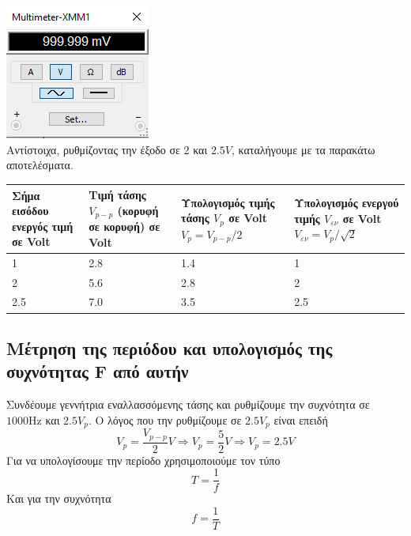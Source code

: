 \documentclass{article}
\begin{document}
\includegraphics[width=\textwidth / 2,center]{./res/ex2vm.png} \\

Αντίστοιχα, ρυθμίζοντας την έξοδο σε 2 και $2.5V$, καταλήγουμε με
τα παρακάτω αποτελέσματα.

\begin{center}
\begin{tabular}{|p{30mm}|p{30mm}|p{30mm}|p{30mm}|}
        \hline
        Σήμα εισόδου ενεργός τιμή σε Volt &
        Τιμή τάσης $V_{p-p}$ (κορυφή σε κορυφή) σε Volt &
        Υπολογισμός τιμής τάσης $V_p$ σε Volt $V_p = V_{p-p} / 2$ &
        Υπολογισμός ενεργού τιμής $V_{εν}$ σε Volt $V_{εν} = V_p / \sqrt 2$ \\
        \hline
        1 & 2.8 & 1.4 & 1 \\
        \hline
        2 & 5.6 & 2.8 & 2 \\
        \hline
        2.5 & 7.0 & 3.5 & 2.5 \\
        \hline
\end{tabular}
\end{center}

\subsection{Μέτρηση της περιόδου και υπολογισμός της συχνότητας F από αυτήν}
Συνδέουμε γεννήτρια εναλλασσόμενης τάσης και ρυθμίζουμε την συχνότητα σε $1000\si{\hertz}$
και $2.5V_{p}$. Ο λόγος που την ρυθμίζουμε σε $2.5V_{p}$ είναι επειδή 
\[V_p = \frac{V_{p-p}}{2}V \Rightarrow V_p = \frac{5}{2}V \Rightarrow V_p = 2.5V\]
Για να υπολογίσουμε την περίοδο χρησιμοποιούμε τον τύπο 
\[T = \frac{1}{f}\]
Και για την συχνότητα
\[f = \frac{1}{T}\]
\end{document}

